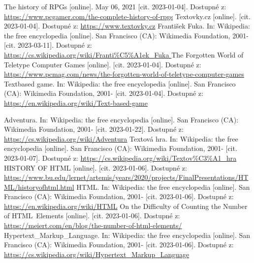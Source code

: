 \documentclass[main.tex]{subfiles}
\begin{document}
\renewcommand{\refname}{Seznam použité literatury a~zdrojů informací} 

\begin{thebibliography}{99}


 The history of RPGs [online]. May 06, 2021 [cit. 2023-01-04]. Dostupné z: \url{https://www.pcgamer.com/the-complete-history-of-rpgs}
 Textovky.cz [online]. [cit. 2023-01-04]. Dostupné z: \url{https://www.textovky.cz}
 František Fuka. In: Wikipedia: the free encyclopedia [online]. San Francisco (CA): Wikimedia Foundation, 2001- [cit. 2023-03-11]. Dostupné z: \url{ https://cs.wikipedia.org/wiki/Franti\%C5\%A1ek\_Fuka }
 The Forgotten World of Teletype Computer Games [online]. [cit. 2023-01-04]. Dostupné z: \url{https://www.pcmag.com/news/the-forgotten-world-of-teletype-computer-games}
 Textbased game. In: Wikipedia: the free encyclopedia [online]. San Francisco (CA): Wikimedia Foundation, 2001- [cit. 2023-01-04]. Dostupné z: \url{https://en.wikipedia.org/wiki/Text-based-game}

 Adventura. In: Wikipedia: the free encyclopedia [online]. San Francisco (CA): Wikimedia Foundation, 2001- [cit. 2023-01-22]. Dostupné z: \url{https://cs.wikipedia.org/wiki/Adventura}
 Textová hra. In: Wikipedia: the free encyclopedia [online]. San Francisco (CA): Wikimedia Foundation, 2001- [cit. 2023-01-07]. Dostupné z: \url{https://cs.wikipedia.org/wiki/Textov\%C3\%A1\_hra}
 HISTORY OF HTML [online]. [cit. 2023-01-06]. Dostupné z: \url{https://www.bu.edu/lernet/artemis/years/2020/projects/FinalPresentations/HTML/historyofhtml.html} 
 HTML. In: Wikipedia: the free encyclopedia [online]. San Francisco (CA): Wikimedia Foundation, 2001- [cit. 2023-01-06]. Dostupné z: \url{https://en.wikipedia.org/wiki/HTML}
 On the Difficulty of Counting the Number of HTML Elements [online]. [cit. 2023-01-06]. Dostupné z: \url{https://meiert.com/en/blog/the-number-of-html-elements/}
 Hypertext\_Markup\_Language. In: Wikipedia: the free encyclopedia [online]. San Francisco (CA): Wikimedia Foundation, 2001- [cit. 2023-01-06]. Dostupné z: \url{https://cs.wikipedia.org/wiki/Hypertext\_Markup\_Language}


\end{thebibliography}
\end{document}
